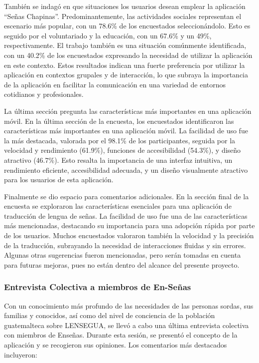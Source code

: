 También se indagó en que situaciones los usuarios desean emplear la aplicación ``Señas Chapinas''. Predominantemente, las actividades sociales representan el escenario más popular, con un 78.6\% de los encuestados seleccionándolo. Esto es seguido por el voluntariado y la educación, con un 67.6\% y un 49\%, respectivamente. El trabajo también es una situación comúnmente identificada, con un 40.2\% de los encuestados expresando la necesidad de utilizar la aplicación en este contexto. Estos resultados indican una fuerte preferencia por utilizar la aplicación en contextos grupales y de interacción, lo que subraya la importancia de la aplicación en facilitar la comunicación en una variedad de entornos cotidianos y profesionales.

La última sección pregunta las características más importantes en una aplicación móvil. En la última sección de la encuesta, los encuestados identificaron las características más importantes en una aplicación móvil. La facilidad de uso fue la más destacada, valorada por el 98.1\% de los participantes, seguida por la velocidad y rendimiento (61.9\%), funciones de accesibilidad (54.3\%), y diseño atractivo (46.7\%). Esto resalta la importancia de una interfaz intuitiva, un rendimiento eficiente, accesibilidad adecuada, y un diseño visualmente atractivo para los usuarios de esta aplicación. 

Finalmente se dio espacio para comentarios adicionales. En la sección final de la encuesta se exploraron las características esenciales para una aplicación de traducción de lengua de señas. La facilidad de uso fue una de las características más mencionadas, destacando su importancia para una adopción rápida por parte de los usuarios. Muchos encuestados valoraron también la velocidad y la precisión de la traducción, subrayando la necesidad de interacciones fluidas y sin errores. Algunas otras sugerencias fueron mencionadas, pero serán tomadas en cuenta para futuras mejoras, pues no están dentro del alcance del presente proyecto. 

\subsubsection{Entrevista Colectiva a miembros de En-Señas}

Con un conocimiento más profundo de las necesidades de las personas sordas, sus familias y conocidos, así como del nivel de conciencia de la población guatemalteca sobre LENSEGUA, se llevó a cabo una última entrevista colectiva con miembros de Enseñas. Durante esta sesión, se presentó el concepto de la aplicación y se recogieron sus opiniones. Los comentarios más destacados incluyeron:

